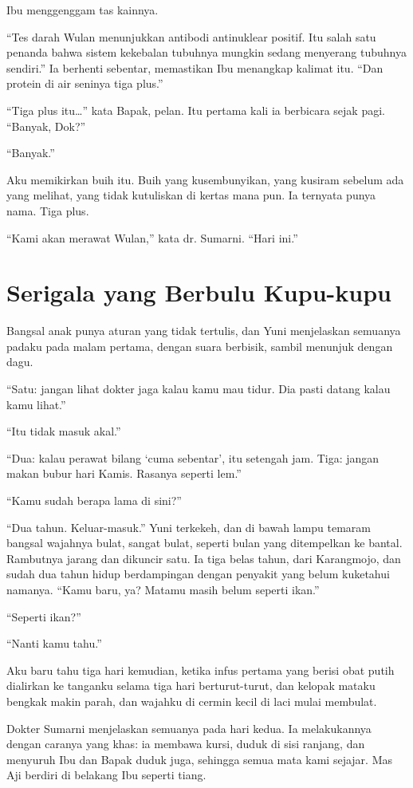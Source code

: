 \documentclass[11pt,twoside,openany]{book}
\makeatletter
\newcommand{\scenebreak}{\par\vspace{0.9em}{\centering\textsc{*\hspace{0.7em}*\hspace{0.7em}*}\par}\vspace{0.9em}\@afterindentfalse\@afterheading}
\makeatother
\begin{document}
Ibu menggenggam tas kainnya.

``Tes darah Wulan menunjukkan antibodi antinuklear positif. Itu salah satu penanda bahwa sistem kekebalan tubuhnya mungkin sedang menyerang tubuhnya sendiri.'' Ia berhenti sebentar, memastikan Ibu menangkap kalimat itu. ``Dan protein di air seninya tiga plus.''

``Tiga plus itu\ldots{}'' kata Bapak, pelan. Itu pertama kali ia berbicara sejak pagi. ``Banyak, Dok?''

``Banyak.''

Aku memikirkan buih itu. Buih yang kusembunyikan, yang kusiram sebelum ada yang melihat, yang tidak kutuliskan di kertas mana pun. Ia ternyata punya nama. Tiga plus.

``Kami akan merawat Wulan,'' kata dr. Sumarni. ``Hari ini.''

\chapter{Serigala yang Berbulu Kupu-kupu}
Bangsal anak punya aturan yang tidak tertulis, dan Yuni menjelaskan semuanya padaku pada malam pertama, dengan suara berbisik, sambil menunjuk dengan dagu.

``Satu: jangan lihat dokter jaga kalau kamu mau tidur. Dia pasti datang kalau kamu lihat.''

``Itu tidak masuk akal.''

``Dua: kalau perawat bilang `cuma sebentar', itu setengah jam. Tiga: jangan makan bubur hari Kamis. Rasanya seperti lem.''

``Kamu sudah berapa lama di sini?''

``Dua tahun. Keluar-masuk.'' Yuni terkekeh, dan di bawah lampu temaram bangsal wajahnya bulat, sangat bulat, seperti bulan yang ditempelkan ke bantal. Rambutnya jarang dan dikuncir satu. Ia tiga belas tahun, dari Karangmojo, dan sudah dua tahun hidup berdampingan dengan penyakit yang belum kuketahui namanya. ``Kamu baru, ya? Matamu masih belum seperti ikan.''

``Seperti ikan?''

``Nanti kamu tahu.''

Aku baru tahu tiga hari kemudian, ketika infus pertama yang berisi obat putih dialirkan ke tanganku selama tiga hari berturut-turut, dan kelopak mataku bengkak makin parah, dan wajahku di cermin kecil di laci mulai membulat.

\scenebreak
Dokter Sumarni menjelaskan semuanya pada hari kedua. Ia melakukannya dengan caranya yang khas: ia membawa kursi, duduk di sisi ranjang, dan menyuruh Ibu dan Bapak duduk juga, sehingga semua mata kami sejajar. Mas Aji berdiri di belakang Ibu seperti tiang.
\end{document}
